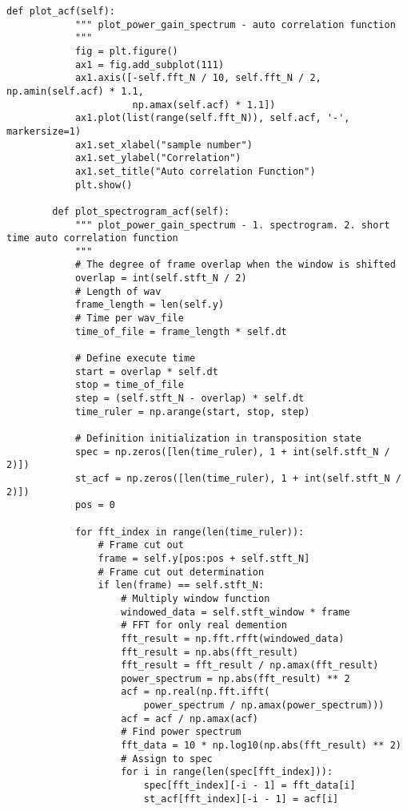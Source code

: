 \begin{lstlisting}[caption=plot\_tools.py,label=plot_tools.py]
        def plot_acf(self):
            """ plot_power_gain_spectrum - auto correlation function
            """
            fig = plt.figure()
            ax1 = fig.add_subplot(111)
            ax1.axis([-self.fft_N / 10, self.fft_N / 2, np.amin(self.acf) * 1.1,
                      np.amax(self.acf) * 1.1])
            ax1.plot(list(range(self.fft_N)), self.acf, '-', markersize=1)
            ax1.set_xlabel("sample number")
            ax1.set_ylabel("Correlation")
            ax1.set_title("Auto correlation Function")
            plt.show()
    
        def plot_spectrogram_acf(self):
            """ plot_power_gain_spectrum - 1. spectrogram. 2. short time auto correlation function
            """
            # The degree of frame overlap when the window is shifted
            overlap = int(self.stft_N / 2)
            # Length of wav
            frame_length = len(self.y)
            # Time per wav_file
            time_of_file = frame_length * self.dt
    
            # Define execute time
            start = overlap * self.dt
            stop = time_of_file
            step = (self.stft_N - overlap) * self.dt
            time_ruler = np.arange(start, stop, step)
    
            # Definition initialization in transposition state
            spec = np.zeros([len(time_ruler), 1 + int(self.stft_N / 2)])
            st_acf = np.zeros([len(time_ruler), 1 + int(self.stft_N / 2)])
            pos = 0
    
            for fft_index in range(len(time_ruler)):
                # Frame cut out
                frame = self.y[pos:pos + self.stft_N]
                # Frame cut out determination
                if len(frame) == self.stft_N:
                    # Multiply window function
                    windowed_data = self.stft_window * frame
                    # FFT for only real demention
                    fft_result = np.fft.rfft(windowed_data)
                    fft_result = np.abs(fft_result)
                    fft_result = fft_result / np.amax(fft_result)
                    power_spectrum = np.abs(fft_result) ** 2
                    acf = np.real(np.fft.ifft(
                        power_spectrum / np.amax(power_spectrum)))
                    acf = acf / np.amax(acf)
                    # Find power spectrum
                    fft_data = 10 * np.log10(np.abs(fft_result) ** 2)
                    # Assign to spec
                    for i in range(len(spec[fft_index])):
                        spec[fft_index][-i - 1] = fft_data[i]
                        st_acf[fft_index][-i - 1] = acf[i]
    

\end{lstlisting}

